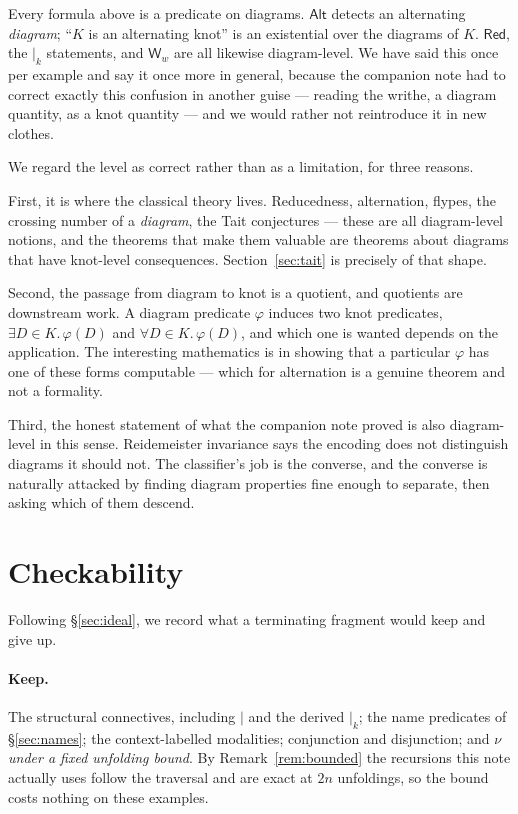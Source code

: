 \documentclass[11pt]{article}
\theoremstyle{definition}
\newcommand{\sep}{\mathbin{\vert}}
\newcommand{\ssep}[1]{\mathbin{\vert_{#1}}}
\begin{document}
Every formula above is a predicate on diagrams. $\mathsf{Alt}$ detects an
alternating \emph{diagram}; ``$K$ is an alternating knot'' is an existential over
the diagrams of $K$. $\mathsf{Red}$, the $\ssep{k}$ statements, and
$\mathsf{W}_w$ are all likewise diagram-level. We have said this once per example
and say it once more in general, because the companion note had to correct exactly
this confusion in another guise --- reading the writhe, a diagram quantity, as a
knot quantity --- and we would rather not reintroduce it in new clothes.

We regard the level as correct rather than as a limitation, for three reasons.

First, it is where the classical theory lives. Reducedness, alternation, flypes,
the crossing number of a \emph{diagram}, the Tait conjectures --- these are all
diagram-level notions, and the theorems that make them valuable are theorems about
diagrams that have knot-level consequences. Section~\ref{sec:tait} is precisely of
that shape.

Second, the passage from diagram to knot is a quotient, and quotients are
downstream work. A diagram predicate $\varphi$ induces two knot predicates,
$\exists D \in K.\, \varphi(D)$ and $\forall D \in K.\, \varphi(D)$, and which one
is wanted depends on the application. The interesting mathematics is in showing
that a particular $\varphi$ has one of these forms computable --- which for
alternation is a genuine theorem and not a formality.

Third, the honest statement of what the companion note proved is also
diagram-level in this sense. Reidemeister invariance says the encoding does not
distinguish diagrams it should not. The classifier's job is the converse, and the
converse is naturally attacked by finding diagram properties fine enough to
separate, then asking which of them descend.

\section{Checkability}\label{sec:check}

Following \S\ref{sec:ideal}, we record what a terminating fragment would keep and
give up.

\paragraph{Keep.}
The structural connectives, including $\sep$ and the derived $\ssep{k}$; the name
predicates of \S\ref{sec:names}; the context-labelled modalities; conjunction and
disjunction; and $\nu$ \emph{under a fixed unfolding bound}. By
Remark~\ref{rem:bounded} the recursions this note actually uses follow the
traversal and are exact at $2n$ unfoldings, so the bound costs nothing on these
examples.
\end{document}
